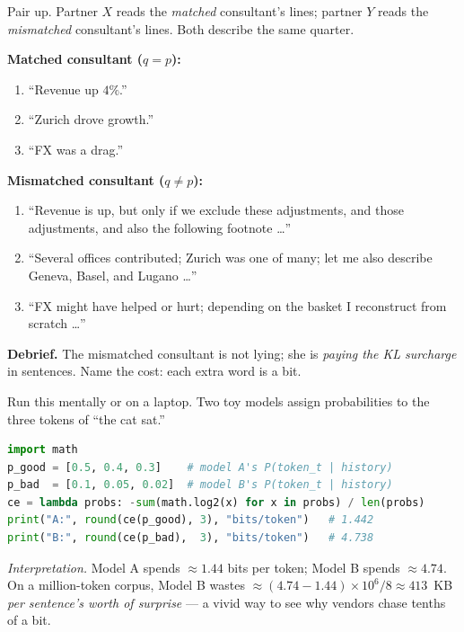 \begin{activity}[title={Activity 3.B --- Role-play: the two consultants (3 min)}]
\label{act:consultants}
Pair up.  Partner $X$ reads the \emph{matched} consultant's lines;
partner $Y$ reads the \emph{mismatched} consultant's lines.  Both
describe the same quarter.

\textbf{Matched consultant ($q = p$):}
\begin{enumerate}[leftmargin=*, itemsep=0pt, label=(M\arabic*)]
  \item ``Revenue up $4\%$.''
  \item ``Zurich drove growth.''
  \item ``FX was a drag.''
\end{enumerate}

\textbf{Mismatched consultant ($q \ne p$):}
\begin{enumerate}[leftmargin=*, itemsep=0pt, label=(W\arabic*)]
  \item ``Revenue is up, but only if we exclude these adjustments,
        and those adjustments, and also the following footnote \dots''
  \item ``Several offices contributed; Zurich was one of many; let me
        also describe Geneva, Basel, and Lugano \dots''
  \item ``FX might have helped or hurt; depending on the basket I
        reconstruct from scratch \dots''
\end{enumerate}

\textbf{Debrief.}  The mismatched consultant is not lying; she is
\emph{paying the KL surcharge} in sentences.  Name the cost: each
extra word is a bit.
\end{activity}

\begin{activity}[title={Activity 3.C --- Per-token cross-entropy in 6 lines of Python}]
\label{act:python}
Run this mentally or on a laptop.  Two toy models assign
probabilities to the three tokens of ``the cat sat.''
\begin{lstlisting}[language=Python]
import math
p_good = [0.5, 0.4, 0.3]    # model A's P(token_t | history)
p_bad  = [0.1, 0.05, 0.02]  # model B's P(token_t | history)
ce = lambda probs: -sum(math.log2(x) for x in probs) / len(probs)
print("A:", round(ce(p_good), 3), "bits/token")   # 1.442
print("B:", round(ce(p_bad),  3), "bits/token")   # 4.738
\end{lstlisting}
\emph{Interpretation.}  Model A spends $\approx 1.44$ bits per
token; Model B spends $\approx 4.74$.  On a million-token corpus,
Model B wastes $\approx (4.74-1.44)\times 10^{6} / 8 \approx 413$~KB
\emph{per sentence's worth of surprise} --- a vivid way to see why
vendors chase tenths of a bit.
\end{activity}

